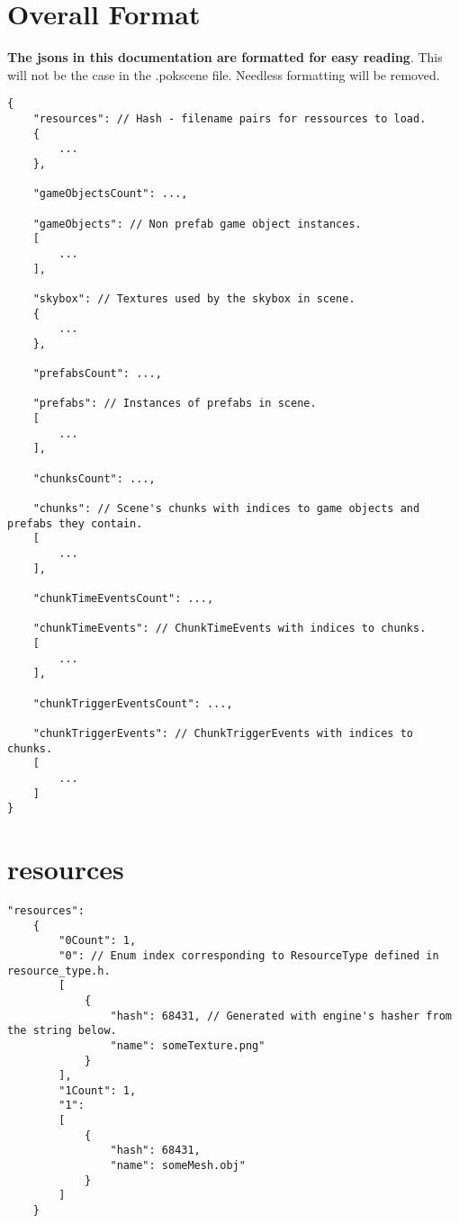\documentclass[10pt,a4paper]{article}
\begin{document}
\section{Overall Format}
\textbf{The jsons in this documentation are formatted for easy reading}. This will not be the case in the .pokscene file. Needless formatting will be removed.
\begin{lstlisting}
{
	"resources": // Hash - filename pairs for ressources to load.
	{
		...	
	},
	
	"gameObjectsCount": ...,
	
	"gameObjects": // Non prefab game object instances.
	[
		...	
	],
	
	"skybox": // Textures used by the skybox in scene.
	{
		...	
	},
	
	"prefabsCount": ...,
	
	"prefabs": // Instances of prefabs in scene.
	[
		...	
	],
	
	"chunksCount": ...,
	
	"chunks": // Scene's chunks with indices to game objects and prefabs they contain.
	[
		...	
	],
	
	"chunkTimeEventsCount": ...,
	
	"chunkTimeEvents": // ChunkTimeEvents with indices to chunks.
	[
		...	
	],
	
	"chunkTriggerEventsCount": ...,
	
	"chunkTriggerEvents": // ChunkTriggerEvents with indices to chunks.
	[
		...	
	]
}
\end{lstlisting}

\newpage

\section{resources}
\begin{lstlisting}
"resources":
	{
		"0Count": 1,
		"0": // Enum index corresponding to ResourceType defined in resource_type.h.
		[
			{
				"hash": 68431, // Generated with engine's hasher from the string below.
				"name": someTexture.png"
			}		
		],
		"1Count": 1,
		"1": 
		[
			{
				"hash": 68431,
				"name": someMesh.obj"		
			}		
		]
	}
\end{lstlisting}

\newpage
\end{document}
